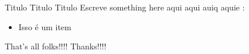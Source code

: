 \documentclass[xcolor=dvipsnames]{beamer}
\begin{document}
        
        
		\begin{frame}{Titulo Titulo Titulo}
		Escreve something here aqui aqui auiq aquie :\\
        \begin{itemize}
        \item Isso é um item
        \end{itemize}
		\end{frame}
        
        
        
        \begin{center}
		 \begin{frame}{That's all folks!!!! }
		Thanks!!!! \\
		\end{frame}
        
		\end{center}
    	

\end{document}
